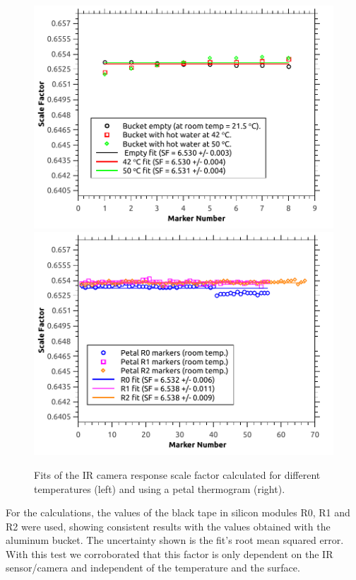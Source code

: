 		\begin{figure}[ht!]
			\centering
			\captionsetup{justification=centering,margin=2cm}
			\includegraphics[scale=0.5]{Figures/Chapter04/BucketScaleFactors.pdf}
			\includegraphics[scale=0.5]{Figures/Chapter04/PetalScaleFactors.pdf}
			\caption{Fits of the IR camera response scale factor calculated for different temperatures (left) and using a petal thermogram (right).}\label{fig4.7}
		\end{figure}
		
		For the calculations, the values of the black tape in silicon modules R0, R1 and R2 were used, showing consistent results with the values obtained with the aluminum bucket. The uncertainty shown is the fit’s root mean squared error. With this test we corroborated that this factor is only dependent on the IR sensor/camera and independent of the temperature and the surface.\bigskip
		
